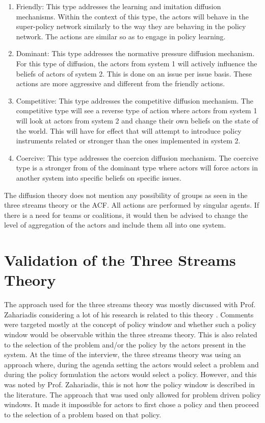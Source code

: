 \begin{enumerate}
\item Friendly: This type addresses the learning and imitation diffusion mechanisms. Within the context of this type, the actors will behave in the super-policy network similarly to the way they are behaving in the policy network. The actions are similar so as to engage in policy learning.
\item Dominant: This type addresses the normative pressure diffusion mechanism. For this type of diffusion, the actors from system 1 will actively influence the beliefs of actors of system 2. This is done on an issue per issue basis. These actions are more aggressive and different from the friendly actions.
\item Competitive: This type addresses the competitive diffusion mechanism. The competitive type will see a reverse type of action where actors from system 1 will look at actors from system 2 and change their own beliefs on the state of the world. This will have for effect that will attempt to introduce policy instruments related or stronger than the ones implemented in system 2.
\item Coercive: This type addresses the coercion diffusion mechanism. The coercive type is a stronger from of the dominant type where actors will force actors in another system into specific beliefs on specific issues.
\end{enumerate}
 
The diffusion theory does not mention any possibility of groups as seen in the three streams theory or the ACF. All actions are performed by singular agents. If there is a need for teams or coalitions, it would then be advised to change the level of aggregation of the actors and include them all into one system.


%
\section{Validation of the Three Streams Theory}
\label{sec:validation3S}
 
The approach used for the three streams theory was mostly discussed with Prof. Zahariadis considering a lot of his research is related to this theory \citep{zahariadis2007multiple, zahariadis2014ambiguity, zahariadis2003ambiguity}. Comments were targeted mostly at the concept of policy window and whether such a policy window would be observable within the three streams theory. This is also related to the selection of the problem and/or the policy by the actors present in the system. At the time of the interview, the three streams theory was using an approach where, during the agenda setting the actors would select a problem and during the policy formulation the actors would select a policy. However, and this was noted by Prof. Zahariadis, this is not how the policy window is described in the literature. The approach that was used only allowed for problem driven policy windows. It made it impossible for actors to first chose a policy and then proceed to the selection of a problem based on that policy.

